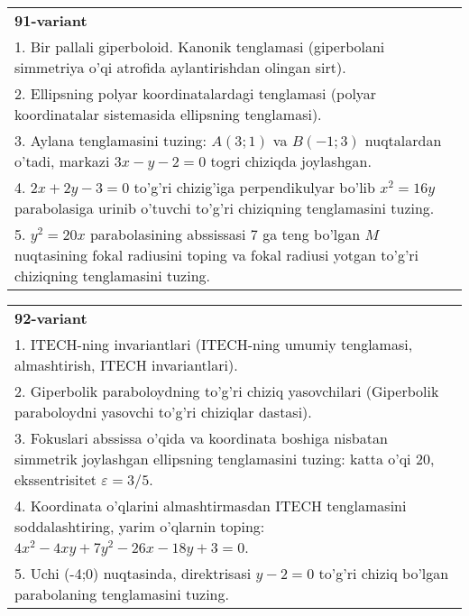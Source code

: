 \documentclass{article}
\begin{document}
\begin{tabular}{m{17cm}}
\textbf{91-variant}\\
1. Bir pallali giperboloid. Kanonik tenglamasi (giperbolani simmetriya o'qi atrofida aylantirishdan olingan sirt).\\

2. Ellipsning polyar koordinatalardagi tenglamasi (polyar koordinatalar sistemasida ellipsning tenglamasi).\\

3. Aylana tenglamasini tuzing: $A(3;1)$ va $B(-1;3)$ nuqtalardan o'tadi, markazi $3x-y-2=0$ togri chiziqda joylashgan.\\

4. $2x + 2y - 3 = 0$ to'g'ri chizig'iga perpendikulyar bo'lib $x^{2} = 16y$ parabolasiga urinib o'tuvchi to'g'ri chiziqning tenglamasini tuzing.  \\

5. $y^{2} = 20x$ parabolasining abssissasi 7 ga teng bo'lgan $M$ nuqtasining fokal radiusini toping va fokal radiusi yotgan to'g'ri chiziqning tenglamasini tuzing.  
\end{tabular}
\vspace{1cm}


\begin{tabular}{m{17cm}}
\textbf{92-variant}\\
1. ITECH-ning invariantlari (ITECH-ning umumiy tenglamasi, almashtirish, ITECH invariantlari).\\

2. Giperbolik paraboloydning to'g'ri chiziq yasovchilari (Giperbolik paraboloydni yasovchi to'g'ri chiziqlar dastasi).\\

3. Fokuslari abssissa o'qida va koordinata boshiga nisbatan simmetrik joylashgan ellipsning tenglamasini tuzing: katta o'qi $20$, ekssentrisitet $\varepsilon=3/5$.\\

4. Koordinata o'qlarini almashtirmasdan ITECH tenglamasini soddalashtiring, yarim o'qlarnin toping: $4x^{2} - 4xy + 7y^{2} - 26x - 18y + 3 = 0$.\\

5. Uchi (-4;0) nuqtasinda, direktrisasi $y - 2 = 0$ to'g'ri chiziq bo'lgan parabolaning tenglamasini tuzing.
\end{tabular}
\vspace{1cm}
\end{document}
